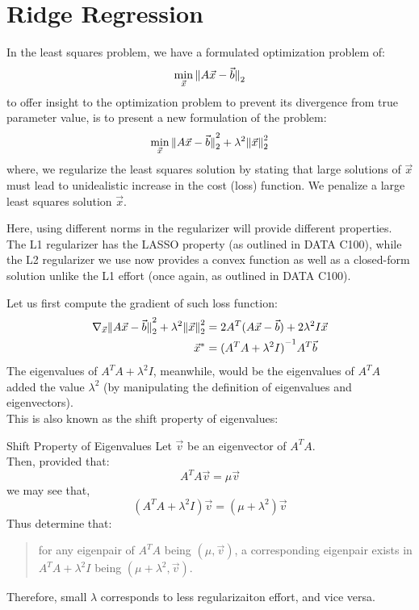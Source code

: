 \section{Ridge Regression}
In the least squares problem, we have a formulated optimization problem of:
\[
    \min_{\vec{x}} \pnorm{A \vec{x} - \vec{b}}{2}
\]
to offer insight to the optimization problem to prevent its divergence from true parameter value, is to present a new formulation of the problem:
\[
    \min_{\vec{x}} \pnorm[2]{A \vec{x} - \vec{b}}{2} + \lambda^2 \pnorm[2]{\vec{x}}{2}
\]
where, we regularize the least squares solution by stating that large solutions of $\vec{x}$ must lead to unidealistic increase in the cost (loss) function.
We penalize a large least squares solution $\vec{x}$.

Here, using different norms in the regularizer will provide different properties.
The L1 regularizer has the LASSO property (as outlined in DATA C100), while the L2 regularizer we use now provides a convex function as well as a closed-form solution unlike the L1 effort (once again, as outlined in DATA C100).

Let us first compute the gradient of such loss function:
\begin{align*}
    \nabla_{\vec{x}} \pnorm[2]{A \vec{x} - \vec{b}}{2} + \lambda^2 \pnorm[2]{\vec{x}}{2}
    &= 2A^T (A \vec{x} - \vec{b}) + 2 \lambda^2 I \vec{x} \\
    \vec{x}^* &= {(A^T A + \lambda^2 I)}^{-1} A^T \vec{b}
\end{align*}
The eigenvalues of $A^T A + \lambda^2 I$, meanwhile, would be the eigenvalues of $A^T A$ added the value $\lambda^2$ (by manipulating the definition of eigenvalues and eigenvectors). \\
This is also known as the shift property of eigenvalues:
\begin{ln-theorem}{Shift Property of Eigenvalues}{}
    Let $\vec{v}$ be an eigenvector of $A^T A$. \\
    Then, provided that:
    \[
        A^T A \vec{v} = \mu \vec{v}
    \]
    we may see that,
    \[
        (A^T A + \lambda^2 I) \vec{v} = (\mu + \lambda^2) \vec{v}
    \]
    Thus determine that:
    \begin{quote}
        for any eigenpair of $A^T A$ being $(\mu, \vec{v})$, a corresponding eigenpair exists in $A^T A + \lambda^2 I$ being $(\mu + \lambda^2, \vec{v})$.
    \end{quote}
\end{ln-theorem}
Therefore, small $\lambda$ corresponds to less regularizaiton effort, and vice versa.

